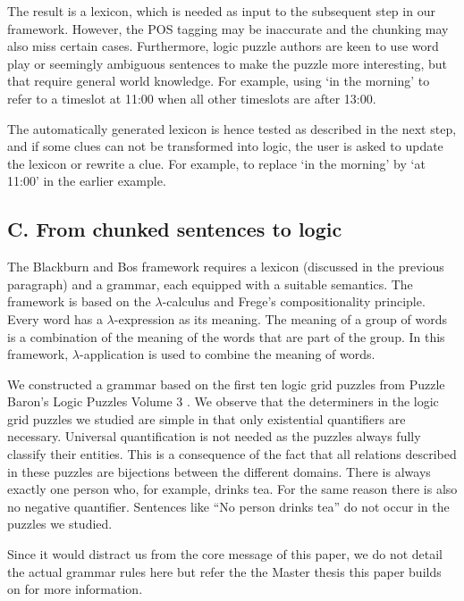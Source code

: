 The result is a lexicon, which is needed as input to the subsequent step in our framework. However, the POS tagging may be inaccurate and the chunking may also miss certain cases. Furthermore, logic puzzle authors are keen to use word play or seemingly ambiguous sentences to make the puzzle more interesting, but that require general world knowledge. For example, using `in the morning' to refer to a timeslot at 11:00 when all other timeslots are after 13:00.

The automatically generated lexicon is hence tested as described in the next step, and if some clues can not be transformed into logic, the user is asked to update the lexicon or rewrite a clue. For example, to replace `in the morning' by `at 11:00' in the earlier example.


\subsection{C. From chunked sentences to logic}
The 
Blackburn and Bos framework requires a lexicon (discussed in the previous paragraph) and a grammar, each equipped with a suitable semantics.  The framework is based on the $\lambda$-calculus and Frege's compositionality principle. Every word has a $\lambda$-expression as its meaning. The meaning of a group of words is a combination of the meaning of the words that are part of the group. In this framework, $\lambda$-application is used to combine the meaning of words.

We constructed a grammar based on the first ten logic grid puzzles from Puzzle Baron's Logic Puzzles Volume 3 \cite{logigrammen}. We observe that the determiners in the logic grid puzzles we studied are simple in that only existential quantifiers are necessary. Universal quantification is not needed as the puzzles always fully classify their entities. This is a consequence of the fact that all relations described in these puzzles are bijections between the different domains. There is always exactly one person who, for example, drinks tea. For the same reason there is also no negative quantifier. Sentences like ``No person drinks tea'' do not occur in the puzzles we studied.

Since it would distract us from the core message of this paper, we do not detail the actual grammar rules here but refer the the Master thesis this paper builds on \cite{msc/Claes17} for more information. 

